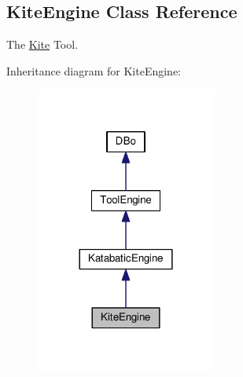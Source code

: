 \hypertarget{classKite_1_1KiteEngine}{}\subsection{Kite\+Engine Class Reference}
\label{classKite_1_1KiteEngine}


The \mbox{\hyperlink{namespaceKite}{Kite}} Tool.  




Inheritance diagram for Kite\+Engine\+:\nopagebreak
\begin{figure}[H]
\begin{center}
\leavevmode
\includegraphics[width=168pt]{classKite_1_1KiteEngine__inherit__graph}
\end{center}
\end{figure}
